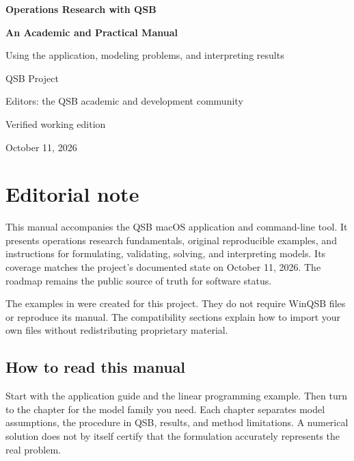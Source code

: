\documentclass[11pt,openany]{book}
\theoremstyle{definition}
\newcommand{\qsb}{\textnormal{\textsc{QSB}}}
\begin{document}
\frontmatter

\begin{titlepage}
  \centering
  \vspace*{2cm}
  {\Huge\bfseries Operations Research with \qsb\par}
  \vspace{0.5cm}
  {\Large\bfseries An Academic and Practical Manual\par}
  \vspace{1.5cm}
  {\Large Using the application, modeling problems, and interpreting results\par}
  \vspace{2cm}
  {\large QSB Project\par}
  \vspace{0.4cm}
  {\large Editors: the QSB academic and development community\par}
  \vfill
  {\large Verified working edition\par}
  {\large October 11, 2026\par}
\end{titlepage}

\chapter*{Editorial note}
This manual accompanies the QSB macOS application and command-line tool. It
presents operations research fundamentals, original reproducible examples, and
instructions for formulating, validating, solving, and interpreting models.
Its coverage matches the project's documented state on October 11, 2026. The
roadmap remains the public source of truth for software status.

The examples in  were created for this project. They do
not require WinQSB files or reproduce its manual. The compatibility sections
explain how to import your own files without redistributing proprietary material.

\section*{How to read this manual}
Start with the application guide and the linear programming example. Then turn
to the chapter for the model family you need. Each chapter separates model
assumptions, the procedure in QSB, results, and method limitations. A numerical
solution does not by itself certify that the formulation accurately represents
the real problem.
\end{document}
